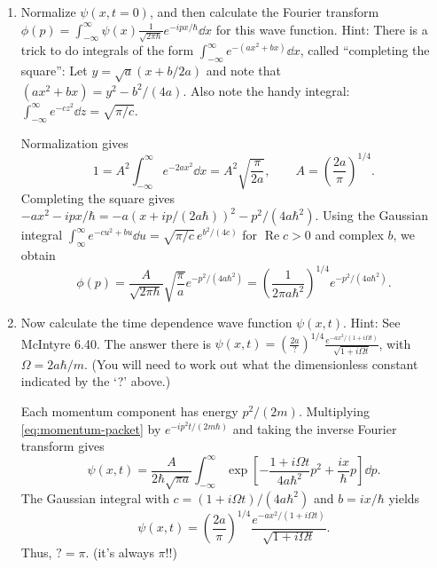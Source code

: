 \documentclass[11pt]{article}
\begin{document}
\begin{enumerate}[label=\arabic*.]
\item Normalize \(\psi(x,t=0)\), and then calculate the Fourier transform\newline
\(\phi(p)=\int_{-\infty}^{\infty}\psi(x)\frac{1}{\sqrt{2\pi\hbar}}e^{-ipx/\hbar}\dd{x}\)
for this wave function. Hint: There is a trick to do integrals of the form
\(\int_{-\infty}^{\infty}e^{-(ax^2+bx)}\dd{x}\), called “completing the square”:
Let \(y=\sqrt{a}(x+b/2a)\) and note that \((ax^2+bx)=y^2-b^2/(4a)\).
        Also note the handy integral: \(\int_{-\infty}^{\infty}e^{-cz^2}\dd{z}=\sqrt{\pi/c}\).
        \begin{answer}
Normalization gives
\begin{equation}\label{eq:normalization}
 1=A^2\int_{-\infty}^{\infty}e^{-2ax^2}\dd{x}
   =A^2\sqrt{\frac{\pi}{2a}},\qquad A=\left(\frac{2a}{\pi}\right)^{1/4}.
\end{equation}
Completing the square gives \(-ax^2-ipx/\hbar=-a(x+ip/(2a\hbar))^2-p^2/(4a\hbar^2)\).
Using the Gaussian integral
\(\int_{\infty}^{\infty}e^{-cu^2+bu}\dd{u}=\sqrt{\pi/c}\,e^{b^2/(4c)}\)
for \(\operatorname{Re} c>0\) and complex \(b\), we obtain
\begin{equation}\label{eq:momentum-packet}
 \phi(p)=\frac{A}{\sqrt{2\pi\hbar}}\sqrt{\frac{\pi}{a}}e^{-p^2/(4a\hbar^2)}
 =\boxed{\left(\frac{1}{2\pi a\hbar^2}\right)^{1/4}e^{-p^2/(4a\hbar^2)}}.
\end{equation}
 \end{answer}
\item Now calculate the time dependence wave function \(\psi(x,t)\). Hint: See McIntyre 6.40.
The answer there is \(\psi(x,t)=\left(\frac{2a}{?}\right)^{1/4}
\frac{e^{-ax^2/(1+i\Omega t)}}{\sqrt{1+i\Omega t}}\), with \(\Omega=2a\hbar/m\).
(You will need to work out what the dimensionless constant indicated by the ‘?’ above.)
        \begin{answer}
Each momentum component has energy \(p^2/(2m)\). Multiplying \cref{eq:momentum-packet} by \(e^{-ip^2t/(2m\hbar)}\) and taking the inverse Fourier transform gives
\begin{equation}\label{eq:time-integral}
 \psi(x,t)=\frac{A}{2\hbar\sqrt{\pi a}}\int_{-\infty}^{\infty}
 \exp\left[-\frac{1+i\Omega t}{4a\hbar^2}p^2+\frac{ix}{\hbar}p\right]\dd{p}.
\end{equation}
The Gaussian integral with \(c=(1+i\Omega t)/(4a\hbar^2)\) and \(b=ix/\hbar\) yields
\begin{equation}\label{eq:time-packet}
 \boxed{\psi(x,t)=\left(\frac{2a}{\pi}\right)^{1/4}
 \frac{e^{-ax^2/(1+i\Omega t)}}{\sqrt{1+i\Omega t}}.}
\end{equation}
Thus, \( ? = \pi \). (it's always \(\pi\)!!)
\end{answer}


\end{enumerate}
\end{document}
